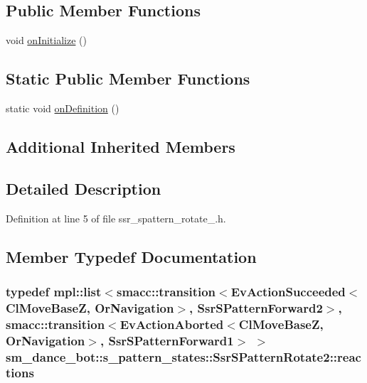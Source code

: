 \subsection*{Public Member Functions}
\begin{DoxyCompactItemize}
\item 
void \hyperlink{structsm__dance__bot_1_1s__pattern__states_1_1SsrSPatternRotate2_a76d42f058a37eb3c0e7915f8b7ee8974}{on\+Initialize} ()
\end{DoxyCompactItemize}
\subsection*{Static Public Member Functions}
\begin{DoxyCompactItemize}
\item 
static void \hyperlink{structsm__dance__bot_1_1s__pattern__states_1_1SsrSPatternRotate2_ae68524a6e0b485f6a79ea132cda08f4b}{on\+Definition} ()
\end{DoxyCompactItemize}
\subsection*{Additional Inherited Members}


\subsection{Detailed Description}


Definition at line 5 of file ssr\+\_\+spattern\+\_\+rotate\+\_.\+h.



\subsection{Member Typedef Documentation}
\subsubsection[{\texorpdfstring{reactions}{reactions}}]{\setlength{\rightskip}{0pt plus 5cm}typedef mpl\+::list$<${\bf smacc\+::transition}$<$Ev\+Action\+Succeeded$<${\bf Cl\+Move\+BaseZ}, {\bf Or\+Navigation}$>$, {\bf Ssr\+S\+Pattern\+Forward2}$>$, {\bf smacc\+::transition}$<$Ev\+Action\+Aborted$<${\bf Cl\+Move\+BaseZ}, {\bf Or\+Navigation}$>$, {\bf Ssr\+S\+Pattern\+Forward1}$>$ $>$ {\bf sm\+\_\+dance\+\_\+bot\+::s\+\_\+pattern\+\_\+states\+::\+Ssr\+S\+Pattern\+Rotate2\+::reactions}}\hypertarget{structsm__dance__bot_1_1s__pattern__states_1_1SsrSPatternRotate2_a67e26e0b1fd32f089eb1f72abe01a46b}{}\label{structsm__dance__bot_1_1s__pattern__states_1_1SsrSPatternRotate2_a67e26e0b1fd32f089eb1f72abe01a46b}


